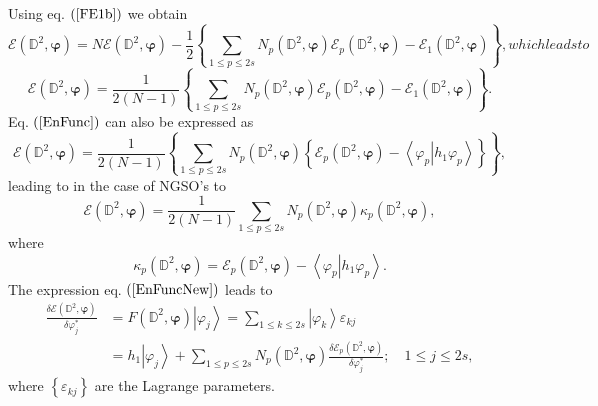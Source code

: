 \documentclass[aps,preprint]{revtex4}%
\begin{document}
Using eq. $\left(  \ref{FE1b}\right)  $ we obtain
\begin{subequations}
\begin{equation}
\mathcal{E}\left(  \mathbb{D}^{2},\bm{\varphi}\right)  =N\mathcal{E}\left(
\mathbb{D}^{2},\bm{\varphi}\right)  -\frac{1}{2}\left\{  \sum_{1\leq p\leq
2s}N_{p}\left(  \mathbb{D}^{2},\bm{\varphi}\right)  \mathcal{E}_{p}\left(
\mathbb{D}^{2},\bm{\varphi}\right)  -\mathcal{E}_{1}\left(  \mathbb{D}%
^{2},\bm{\varphi}\right)  \right\}  ,
\end{equation}
which leads to
\end{subequations}
\begin{equation}
\mathcal{E}\left(  \mathbb{D}^{2},\bm{\varphi}\right)  =\frac{1}{2\left(
N-1\right)  }\left\{  \sum_{1\leq p\leq2s}N_{p}\left(  \mathbb{D}%
^{2},\bm{\varphi}\right)  \mathcal{E}_{p}\left(  \mathbb{D}^{2}%
,\bm{\varphi}\right)  -\mathcal{E}_{1}\left(  \mathbb{D}^{2}%
,\bm{\varphi}\right)  \right\}  . \label{EnFunc}%
\end{equation}
Eq. $\left(  \ref{EnFunc}\right)  $ can also be expressed as
\begin{equation}
\mathcal{E}\left(  \mathbb{D}^{2},\bm{\varphi}\right)  =\frac{1}{2\left(
N-1\right)  }\left\{  \sum_{1\leq p\leq2s}N_{p}\left(  \mathbb{D}%
^{2},\bm{\varphi}\right)  \left\{  \mathcal{E}_{p}\left(  \mathbb{D}%
^{2},\bm{\varphi}\right)  -\left\langle \left.  \varphi_{p}\right\vert
h_{1}\varphi_{p}\right\rangle \right\}  \right\}  , \label{EnFuncNew}%
\end{equation}
leading to in the case of NGSO's to
\begin{equation}
\mathcal{E}\left(  \mathbb{D}^{2},\bm{\varphi}\right)  =\frac{1}{2\left(
N-1\right)  }\sum_{1\leq p\leq2s}N_{p}\left(  \mathbb{D}^{2}%
,\bm{\varphi }\right)  \kappa_{p}\left(  \mathbb{D}^{2},\bm{\varphi}\right)  ,
\end{equation}
where
\begin{equation}
\kappa_{p}\left(  \mathbb{D}^{2},\bm{\varphi}\right)  =\mathcal{E}_{p}\left(
\mathbb{D}^{2},\bm{\varphi}\right)  -\left\langle \left.  \varphi
_{p}\right\vert h_{1}\varphi_{p}\right\rangle .
\end{equation}
The expression eq. $\left(  \ref{EnFuncNew}\right)  $ leads to
\begin{align}
\frac{\delta\mathcal{E}\left(  \mathbb{D}^{2},\bm{\varphi}\right)  }%
{\delta\varphi_{j}^{\ast}}  &  =F\left(  \mathbb{D}^{2},\bm{\varphi }\right)
\left\vert \varphi_{j}\right\rangle =\sum_{1\leq k\leq2s}\left\vert
\varphi_{k}\right\rangle \varepsilon_{kj}\nonumber\\
&  =h_{1}\left\vert \varphi_{j}\right\rangle +\sum_{1\leq p\leq2s}N_{p}\left(
\mathbb{D}^{2},\bm{\varphi}\right)  \frac{\delta\mathcal{E}_{p}\left(
\mathbb{D}^{2},\bm{\varphi}\right)  }{\delta\varphi_{j}^{\ast}};\quad1\leq
j\leq2s,
\end{align}
where $\left\{  \varepsilon_{kj}\right\}  $ are the Lagrange parameters.



\end{document}
